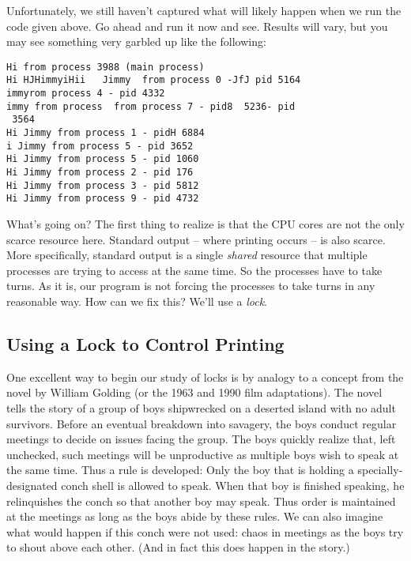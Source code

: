 \documentclass[letterpaper,10pt,openany,oneside]{sphinxmanual}
\begin{document}
Unfortunately, we still haven’t captured what will likely happen when we
run the code given above. Go ahead and run it now and
see. Results will vary, but you may see something very garbled up like
the following:

\begin{Verbatim}[commandchars=\\\{\}]
Hi from process 3988 (main process)
Hi HJHimmyiHii   Jimmy  from process 0 -JfJ pid 5164
immyrom process 4 - pid 4332
immy from process  from process 7 - pid8  5236- pid
 3564
Hi Jimmy from process 1 - pidH 6884
i Jimmy from process 5 - pid 3652
Hi Jimmy from process 5 - pid 1060
Hi Jimmy from process 2 - pid 176
Hi Jimmy from process 3 - pid 5812
Hi Jimmy from process 9 - pid 4732
\end{Verbatim}

What’s going on? The first thing to realize is that the CPU cores are
not the only scarce resource here. Standard output – where printing
occurs – is also scarce. More specifically, standard output is a single
\emph{shared} resource that multiple processes are trying to access at the
same time. So the processes have to take turns. As it is, our program is
not forcing the processes to take turns in any reasonable way. How can
we fix this? We’ll use a \emph{lock}.


\subsection{Using a Lock to Control Printing}
\label{ExecutionOrderAndResources:using-a-lock-to-control-printing}
One excellent way to begin our study of locks is by analogy to a concept
from the novel by William Golding (or the 1963 and 1990 film
adaptations). The novel tells the story of a group of boys shipwrecked
on a deserted island with no adult survivors. Before an eventual
breakdown into savagery, the boys conduct regular meetings to decide on
issues facing the group. The boys quickly realize that, left unchecked,
such meetings will be unproductive as multiple boys wish to speak at the
same time. Thus a rule is developed: Only the boy that is holding a
specially-designated conch shell is allowed to speak. When that boy is
finished speaking, he relinquishes the conch so that another boy may
speak. Thus order is maintained at the meetings as long as the boys
abide by these rules. We can also imagine what would happen if this
conch were not used: chaos in meetings as the boys try to shout above
each other. (And in fact this does happen in the story.)
\end{document}
